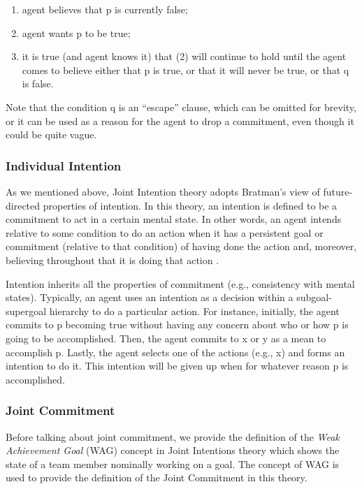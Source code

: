 \documentclass[12pt]{report}
\begin{document}
\begin{enumerate}
  \item agent believes that p is currently false;
  \item agent wants p to be true;
  \item it is true (and agent knows it) that (2) will continue to hold until the
  agent comes to believe either that p is true, or that it will never be true,
  or that q is false.
\end{enumerate}

Note that the condition q is an ``escape'' clause, which can be omitted for
brevity, or it can be used as a reason for the agent to drop a commitment, even
though it could be quite vague.

\subsubsection{Individual Intention}
\label{sec:individual-intention}

As we mentioned above, Joint Intention theory adopts Bratman's view of
future-directed properties of intention. In this theory, an intention is defined
to be a commitment to act in a certain mental state. In other words, an agent
intends relative to some condition to do an action when it has a persistent goal
or commitment (relative to that condition) of having done the action and,
moreover, believing throughout that it is doing that action
\cite{cohen:teamwork}.

Intention inherits all the properties of commitment (e.g., consistency with
mental states). Typically, an agent uses an intention as a decision within a
subgoal-supergoal hierarchy to do a particular action. For instance, initially,
the agent commits to p becoming true without having any concern about who or
how p is going to be accomplished. Then, the agent commits to x or y as a mean
to accomplish p. Lastly, the agent selects one of the actions (e.g., x) and
forms an intention to do it. This intention will be given up when for whatever
reason p is accomplished.

\subsubsection{Joint Commitment}
\label{sec:jpg}

Before talking about joint commitment, we provide the definition of
the \textit{Weak Achievement Goal} (WAG) concept in Joint Intentions theory
which shows the state of a team member nominally working on a goal. The concept
of WAG is used to provide the definition of the Joint Commitment in this
theory.\\
\end{document}
